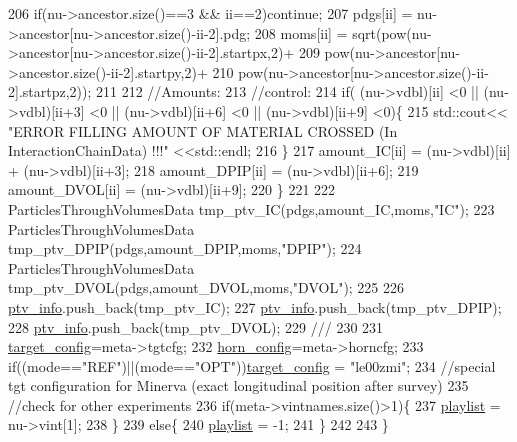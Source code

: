 \begin{DoxyCode}
206       \textcolor{keywordflow}{if}(nu->ancestor.size()==3 && ii==2)\textcolor{keywordflow}{continue};
207       pdgs[ii] = nu->ancestor[nu->ancestor.size()-ii-2].pdg;
208       moms[ii] = sqrt(pow(nu->ancestor[nu->ancestor.size()-ii-2].startpx,2)+
209                         pow(nu->ancestor[nu->ancestor.size()-ii-2].startpy,2)+
210                         pow(nu->ancestor[nu->ancestor.size()-ii-2].startpz,2));
211       
212       \textcolor{comment}{//Amounts:}
213       \textcolor{comment}{//control:}
214       \textcolor{keywordflow}{if}( (nu->vdbl)[ii] <0 || (nu->vdbl)[ii+3] <0 || (nu->vdbl)[ii+6] <0 || (nu->vdbl)[ii+9] <0)\{
215         std::cout<< \textcolor{stringliteral}{"ERROR FILLING AMOUNT OF MATERIAL CROSSED (In InteractionChainData) !!!"} <<std::endl;
216       \}
217       amount\_IC[ii]   = (nu->vdbl)[ii] + (nu->vdbl)[ii+3];
218       amount\_DPIP[ii] = (nu->vdbl)[ii+6];
219       amount\_DVOL[ii] = (nu->vdbl)[ii+9];
220     \}
221     
222     ParticlesThroughVolumesData tmp\_ptv\_IC(pdgs,amount\_IC,moms,\textcolor{stringliteral}{"IC"});
223     ParticlesThroughVolumesData tmp\_ptv\_DPIP(pdgs,amount\_DPIP,moms,\textcolor{stringliteral}{"DPIP"});
224     ParticlesThroughVolumesData tmp\_ptv\_DVOL(pdgs,amount\_DVOL,moms,\textcolor{stringliteral}{"DVOL"});
225     
226     \hyperlink{class_neutrino_flux_reweight_1_1_interaction_chain_data_adda6bc8863579964b62e3d4f51e14926}{ptv\_info}.push\_back(tmp\_ptv\_IC);
227     \hyperlink{class_neutrino_flux_reweight_1_1_interaction_chain_data_adda6bc8863579964b62e3d4f51e14926}{ptv\_info}.push\_back(tmp\_ptv\_DPIP);
228     \hyperlink{class_neutrino_flux_reweight_1_1_interaction_chain_data_adda6bc8863579964b62e3d4f51e14926}{ptv\_info}.push\_back(tmp\_ptv\_DVOL);\textcolor{comment}{}
229 \textcolor{comment}{    ///}
230 \textcolor{comment}{}    
231     \hyperlink{class_neutrino_flux_reweight_1_1_interaction_chain_data_a8362a0f94df2bd321e0b60a38c41fb7a}{target\_config}=meta->tgtcfg;
232     \hyperlink{class_neutrino_flux_reweight_1_1_interaction_chain_data_a343d6a28ec2d41252a6067833b75f831}{horn\_config}=meta->horncfg;
233     \textcolor{keywordflow}{if}((mode==\textcolor{stringliteral}{"REF"})||(mode==\textcolor{stringliteral}{"OPT"}))\hyperlink{class_neutrino_flux_reweight_1_1_interaction_chain_data_a8362a0f94df2bd321e0b60a38c41fb7a}{target\_config} = \textcolor{stringliteral}{"le00zmi"};
234     \textcolor{comment}{//special tgt configuration for Minerva (exact longitudinal position after survey)}
235     \textcolor{comment}{//check for other experiments}
236     \textcolor{keywordflow}{if}(meta->vintnames.size()>1)\{
237       \hyperlink{class_neutrino_flux_reweight_1_1_interaction_chain_data_aca185ce4c11a46ea16b29a55ff97a490}{playlist} = nu->vint[1];
238     \}
239     \textcolor{keywordflow}{else}\{
240       \hyperlink{class_neutrino_flux_reweight_1_1_interaction_chain_data_aca185ce4c11a46ea16b29a55ff97a490}{playlist} = -1;
241     \}
242     
243   \}
\end{DoxyCode}


